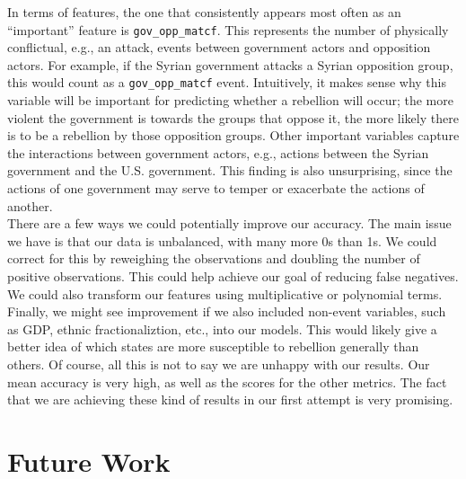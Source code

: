 \documentclass[12pt, letterpaper]{article}
\begin{document}
In terms of features, the one that consistently appears most often as an ``important'' feature is \texttt{gov\_opp\_matcf}.
This represents the number of physically conflictual, e.g., an attack, events between government actors and opposition
actors. For example, if the Syrian government attacks a Syrian opposition group, this would count as a 
\texttt{gov\_opp\_matcf} event. Intuitively, it makes sense why this variable will be important for predicting whether a 
rebellion will occur; the more violent the government is towards the groups that oppose it, the more likely there is to
be a rebellion by those opposition groups. Other important variables capture the interactions between government actors, 
e.g., actions between the Syrian government and the U.S. government. This finding is also unsurprising, since the actions
of one government may serve to temper or exacerbate the actions of another.\\


There are a few ways we could potentially improve our accuracy. The main issue we have is that our data is unbalanced, with many more 0s than 1s. 
We could correct for this by reweighing the observations and doubling the number of positive observations. This could help achieve our goal of 
reducing false negatives. We could also transform our features using multiplicative or polynomial terms. Finally, we might see improvement if we 
also included non-event variables, such as GDP, ethnic fractionaliztion, etc., into our models. This would likely give a better idea of which 
states are more susceptible to rebellion generally than others. Of course, all this is not to say we are unhappy with our results. Our mean 
accuracy is very high, as well as the scores for the other metrics. The fact that we are achieving these kind of results in our first attempt is 
very promising.\\

\section*{Future Work}

\end{document}

